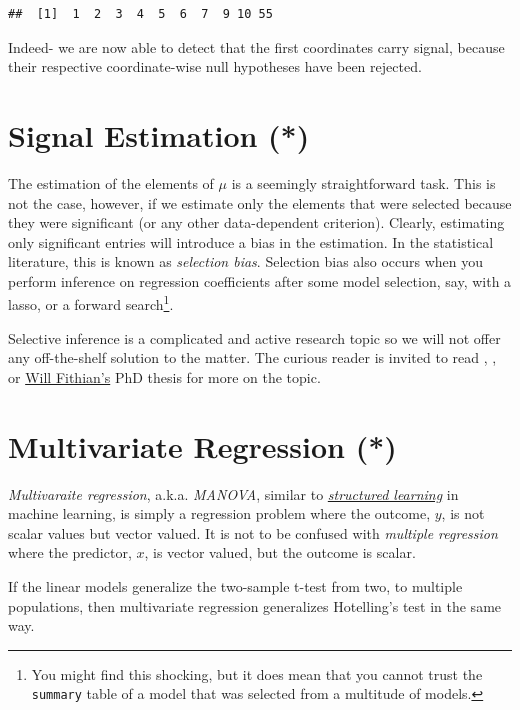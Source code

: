 \documentclass[]{book}
\theoremstyle{definition}
\theoremstyle{definition}
\theoremstyle{definition}
\theoremstyle{remark}
\begin{document}
\begin{verbatim}
##  [1]  1  2  3  4  5  6  7  9 10 55
\end{verbatim}

Indeed- we are now able to detect that the first coordinates carry
signal, because their respective coordinate-wise null hypotheses have
been rejected.

\section{Signal Estimation (*)}\label{signal-estimation}

The estimation of the elements of \(\mu\) is a seemingly straightforward
task. This is not the case, however, if we estimate only the elements
that were selected because they were significant (or any other
data-dependent criterion). Clearly, estimating only significant entries
will introduce a bias in the estimation. In the statistical literature,
this is known as \emph{selection bias}. Selection bias also occurs when
you perform inference on regression coefficients after some model
selection, say, with a lasso, or a forward search\footnote{You might
  find this shocking, but it does mean that you cannot trust the
  \texttt{summary} table of a model that was selected from a multitude
  of models.}.

Selective inference is a complicated and active research topic so we
will not offer any off-the-shelf solution to the matter. The curious
reader is invited to read \citet{rosenblatt2014selective},
\citet{javanmard2014confidence}, or
\href{http://www.stat.berkeley.edu/~wfithian/}{Will Fithian's} PhD
thesis \citep{fithian2015topics} for more on the topic.

\section{Multivariate Regression (*)}\label{multivariate-regression}

\emph{Multivaraite regression}, a.k.a. \emph{MANOVA}, similar to
\href{https://en.wikipedia.org/wiki/Structured_prediction}{\emph{structured
learning}} in machine learning, is simply a regression problem where the
outcome, \(y\), is not scalar values but vector valued. It is not to be
confused with \emph{multiple regression} where the predictor, \(x\), is
vector valued, but the outcome is scalar.

If the linear models generalize the two-sample t-test from two, to
multiple populations, then multivariate regression generalizes
Hotelling's test in the same way.
\end{document}
